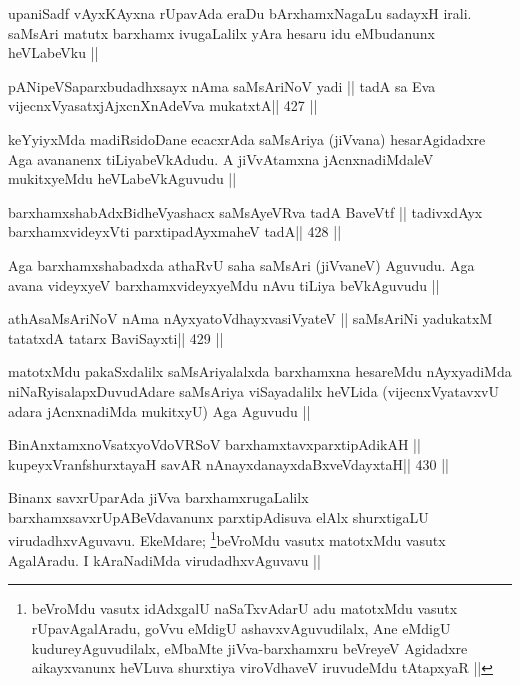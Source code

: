 \begin{artha}
upaniSadf vAyxKAyxna rUpavAda eraDu bArxhamxNagaLu sadayxH irali.
saMsAri matutx barxhamx ivugaLalilx yAra hesaru idu eMbudanunx
heVLabeVku ||
\end{artha}

\begin{shl}
pANipeVSaparxbudadhxsayx nAma saMsAriNoV yadi ||
tadA sa Eva vijecnxVyasatxjAjxcnXnAdeVva mukatxtA\hfill || 427 ||
\end{shl}

\begin{artha}
keYyiyxMda madiRsidoDane ecacxrAda saMsAriya (jiVvana) hesarAgidadxre
Aga avananenx tiLiyabeVkAdudu. A jiVvAtamxna jAcnxnadiMdaleV
mukitxyeMdu heVLabeVkAguvudu || 
\end{artha}


\begin{shl}
barxhamxshabAdxBidheVyashacx saMsAyeVRva tadA BaveVtf ||
tadivxdAyx barxhamxvideyxVti parxtipadAyxmaheV tadA\hfill || 428 ||
\end{shl}

\begin{artha}
Aga barxhamxshabadxda athaRvU saha saMsAri (jiVvaneV) Aguvudu. Aga
avana videyxyeV barxhamxvideyxyeMdu nAvu tiLiya beVkAguvudu ||
\end{artha}

\begin{shl}
athAsaMsAriNoV nAma nAyxyatoV\s dhayxvasiVyateV ||
saMsAriNi yadukatxM tatatxdA tatarx BaviSayxti\hfill || 429 ||
\end{shl}

\begin{artha}
matotxMdu pakaSxdalilx saMsAriyalalxda barxhamxna hesareMdu
nAyxyadiMda niNaRyisalapxDuvudAdare saMsAriya viSayadalilx heVLida
(vijecnxVyatavxvU adara jAcnxnadiMda mukitxyU) Aga Aguvudu ||
\end{artha}




\begin{shl}
BinAnxtamxnoVsatxyoVdoVRSoV barxhamxtavxparxtipAdikAH ||
kupeyxVranfshurxtayaH savAR nAnayxdanayxdaBxveVdayxtaH\hfill || 430 ||
\end{shl}

\begin{artha}
Binanx savxrUparAda jiVva barxhamxrugaLalilx barxhamxsavxrUpABeVdavanunx
parxtipAdisuva elAlx shurxtigaLU virudadhxvAguvavu. EkeMdare; 
\footnote[1]{beVroMdu vasutx idAdxgalU naSaTxvAdarU adu matotxMdu vasutx
rUpavAgalAradu, goVvu eMdigU ashavxvAguvudilalx, Ane eMdigU
kudureyAguvudilalx, eMbaMte jiVva-barxhamxru beVreyeV Agidadxre
aikayxvanunx heVLuva shurxtiya viroVdhaveV iruvudeMdu tAtapxyaR ||}beVroMdu
vasutx matotxMdu vasutx AgalAradu. I kAraNadiMda virudadhxvAguvavu ||
\end{artha}

